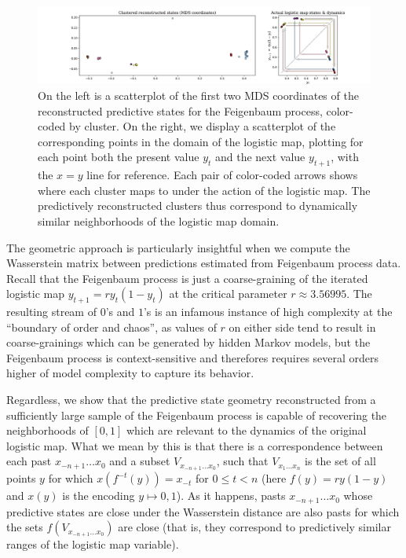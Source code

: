 \documentclass[sigconf, anonymous, review]{acmart}
\begin{document}
\begin{figure}[h]
  \centering
  \includegraphics[width=\linewidth]{../plots/feig_MDS.pdf}
  \caption{On the left is a scatterplot of the first two MDS coordinates 
  of the reconstructed predictive states for the Feigenbaum process, 
  color-coded by cluster. On the right, we display a scatterplot of the
  corresponding points in the domain of the logistic map, plotting for each
  point both the present value $y_t$ and the next value $y_{t+1}$, with the
  $x=y$ line for reference. Each pair of color-coded arrows shows where each
  cluster maps to under the action of the logistic map. The predictively
  reconstructed clusters thus correspond to dynamically similar neighborhoods of
  the logistic map domain.}
    \label{fig:mds-feig}
\end{figure}

The geometric approach is particularly insightful when we compute the
Wasserstein matrix between predictions estimated from Feigenbaum process data.
Recall that the Feigenbaum process is just a coarse-graining of the iterated
logistic map $y_{t+1} = ry_t(1-y_t)$ at the critical parameter $r\approx
3.56995$. The resulting stream of $0$'s and $1$'s is an infamous instance of
high complexity at the ``boundary of order and chaos'', as values of $r$ on
either side tend to result in coarse-grainings which can be generated by hidden
Markov models, but the Feigenbaum process is context-sensitive and therefores
requires several orders higher of model complexity to capture its behavior.

Regardless, we show that the predictive state geometry reconstructed from a
sufficiently large sample of the Feigenbaum process is capable of recovering the
neighborhoods of $[0,1]$ which are relevant to the dynamics of the original
logistic map. What we mean by this is that there is a correspondence between
each past $x_{-n+1}\dots x_{0}$ and a subset $V_{x_{-n+1}\dots x_{0}}$, such
that $V_{x_1\dots x_n}$ is the set of all points $y$ for which $x(f^{-t}(y)) =
x_{-t}$ for $0\leq t < n$ (here $f(y) = ry(1-y)$ and $x(y)$ is the encoding
$y\mapsto 0,1$). As it happens, pasts $x_{-n+1}\dots x_{0}$ whose predictive
states are close under the Wasserstein distance are also pasts for which the
sets $f(V_{x_{-n+1}\dots x_{0}})$ are close (that is, they correspond to
predictively similar ranges of the logistic map variable). 
\end{document}

